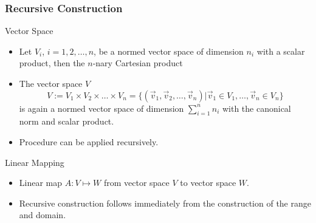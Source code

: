 \begin{frame}\frametitle{Recursive Construction}
  \begin{block}{Vector Space}
      \begin{itemize}
      \item Let $V_i$, $i=1, 2, \ldots,  n$, be a normed vector space of dimension
        $n_i$ with a
        scalar product, then the $n$-nary Cartesian product
      \item The vector space $V$ 
        \begin{equation*}
          V :=  V_1\times V_2 \times \ldots \times V_n = \{(\vec v_1, \vec v_2,
          \ldots, \vec v_n) | \vec v_1 \in V_1,
          \ldots, \vec v_n \in V_n\}
        \end{equation*}
        is again a normed vector space of dimension $\sum_{i=1}^n n_i$
        with the canonical norm and scalar product.
      \item Procedure can be applied recursively.
      \end{itemize}
  \end{block}\pause
  \begin{block}{Linear Mapping}
    \begin{itemize}
    \item  Linear map $A: V \mapsto
W$ from vector space $V$ to vector space $W$.
    \item Recursive construction follows immediately from the construction
    of the range and domain.
    \end{itemize}
  \end{block}
\end{frame}

